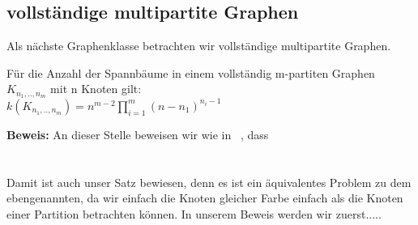 \subsection{vollständige multipartite Graphen}
 
Als nächste Graphenklasse betrachten wir vollständige multipartite Graphen.

\begin{Tms}
 Für die Anzahl der Spannbäume in einem vollständig m-partiten Graphen $K_{n_1,..,n_m}$ mit n Knoten gilt:\\
 $\mathit{k}(K_{n_1,..,n_m})=n^{m-2}\prod_{i=1}^{m}(n-n_1)^{n_i-1}$
\end{Tms}
\textbf{Beweis:}
An dieser Stelle beweisen wir wie in ~\cite{austin_1960}, dass\\ \\ \\%
Damit ist auch unser Satz bewiesen, denn es ist ein äquivalentes Problem zu dem ebengenannten, da wir einfach die Knoten gleicher Farbe einfach als die Knoten einer Partition betrachten können.
In unserem Beweis werden wir zuerst.....
